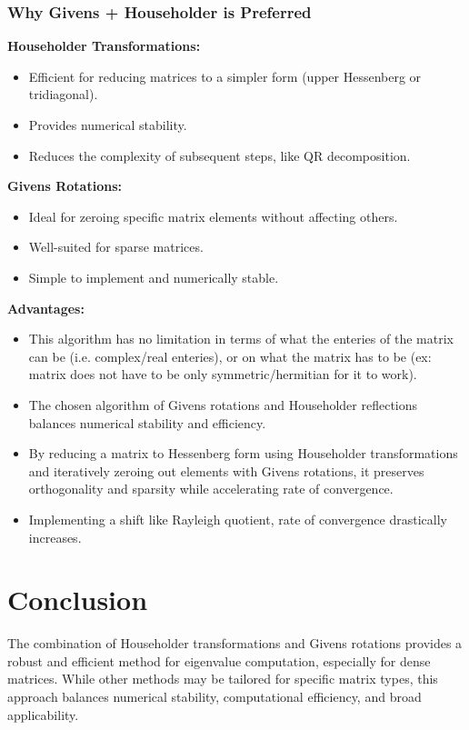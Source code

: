 \documentclass[12pt]{article}
\begin{document}
\subsubsection*{Why Givens + Householder is Preferred}
\textbf{Householder Transformations:}
\begin{itemize}
    \item Efficient for reducing matrices to a simpler form (upper Hessenberg or tridiagonal).
    \item Provides numerical stability.
    \item Reduces the complexity of subsequent steps, like QR decomposition.
\end{itemize}
\textbf{Givens Rotations:}
\begin{itemize}
    \item Ideal for zeroing specific matrix elements without affecting others.
    \item Well-suited for sparse matrices.
    \item Simple to implement and numerically stable.
\end{itemize}
\textbf{Advantages:}
\begin{itemize}
\item This algorithm has no limitation in terms of what the enteries of the matrix can be (i.e. complex/real enteries), or on what the matrix has to be (ex: matrix does not have to be only symmetric/hermitian for it to work). 
\item The chosen algorithm of Givens rotations and Householder reflections balances numerical stability and efficiency. 
\item By reducing a matrix to Hessenberg form using Householder transformations and iteratively zeroing out elements with Givens rotations, it preserves orthogonality and sparsity while accelerating rate of convergence. 
\item Implementing a shift like Rayleigh quotient, rate of convergence drastically increases. 
\end{itemize}


\section{Conclusion}
The combination of Householder transformations and Givens rotations provides a robust and efficient method for eigenvalue computation, especially for dense matrices. While other methods may be tailored for specific matrix types, this approach balances numerical stability, computational efficiency, and broad applicability.
\end{document}
